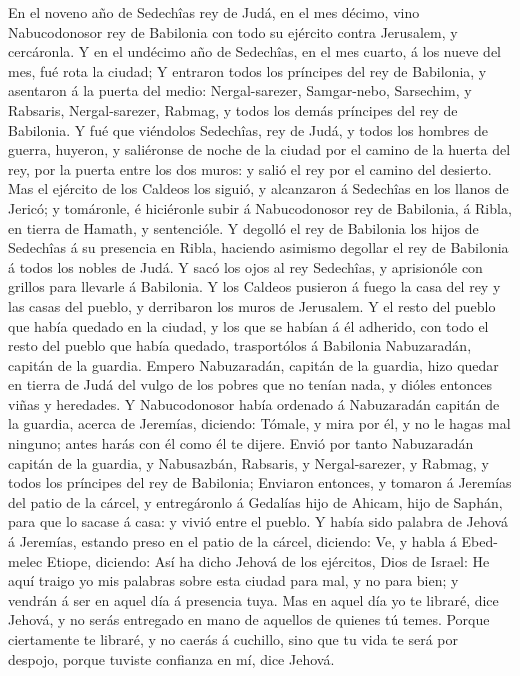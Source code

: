  En el noveno año de Sedechîas rey de Judá, en el mes
décimo, vino Nabucodonosor rey de Babilonia con todo su ejército contra
Jerusalem, y cercáronla.  Y en el undécimo año de
Sedechîas, en el mes cuarto, á los nueve del mes, fué rota la ciudad;
 Y entraron todos los príncipes del rey de Babilonia, y
asentaron á la puerta del medio: Nergal-sarezer, Samgar-nebo, Sarsechim,
y Rabsaris, Nergal-sarezer, Rabmag, y todos los demás príncipes del rey
de Babilonia.  Y fué que viéndolos Sedechîas, rey de Judá,
y todos los hombres de guerra, huyeron, y saliéronse de noche de la
ciudad por el camino de la huerta del rey, por la puerta entre los dos
muros: y salió el rey por el camino del desierto.  Mas el
ejército de los Caldeos los siguió, y alcanzaron á Sedechîas en los
llanos de Jericó; y tomáronle, é hiciéronle subir á Nabucodonosor rey de
Babilonia, á Ribla, en tierra de Hamath, y sentencióle.  Y
degolló el rey de Babilonia los hijos de Sedechîas á su presencia en
Ribla, haciendo asimismo degollar el rey de Babilonia á todos los nobles
de Judá.  Y sacó los ojos al rey Sedechîas, y aprisionóle
con grillos para llevarle á Babilonia.  Y los Caldeos
pusieron á fuego la casa del rey y las casas del pueblo, y derribaron
los muros de Jerusalem.  Y el resto del pueblo que había
quedado en la ciudad, y los que se habían á él adherido, con todo el
resto del pueblo que había quedado, trasportólos á Babilonia
Nabuzaradán, capitán de la guardia.  Empero Nabuzaradán,
capitán de la guardia, hizo quedar en tierra de Judá del vulgo de los
pobres que no tenían nada, y dióles entonces viñas y heredades.
 Y Nabucodonosor había ordenado á Nabuzaradán capitán de
la guardia, acerca de Jeremías, diciendo:  Tómale, y mira
por él, y no le hagas mal ninguno; antes harás con él como él te dijere.
 Envió por tanto Nabuzaradán capitán de la guardia, y
Nabusazbán, Rabsaris, y Nergal-sarezer, y Rabmag, y todos los príncipes
del rey de Babilonia;  Enviaron entonces, y tomaron á
Jeremías del patio de la cárcel, y entregáronlo á Gedalías hijo de
Ahicam, hijo de Saphán, para que lo sacase á casa: y vivió entre el
pueblo.  Y había sido palabra de Jehová á Jeremías,
estando preso en el patio de la cárcel, diciendo:  Ve, y
habla á Ebed-melec Etiope, diciendo: Así ha dicho Jehová de los
ejércitos, Dios de Israel: He aquí traigo yo mis palabras sobre esta
ciudad para mal, y no para bien; y vendrán á ser en aquel día á
presencia tuya.  Mas en aquel día yo te libraré, dice
Jehová, y no serás entregado en mano de aquellos de quienes tú temes.
 Porque ciertamente te libraré, y no caerás á cuchillo,
sino que tu vida te será por despojo, porque tuviste confianza en mí,
dice Jehová.

